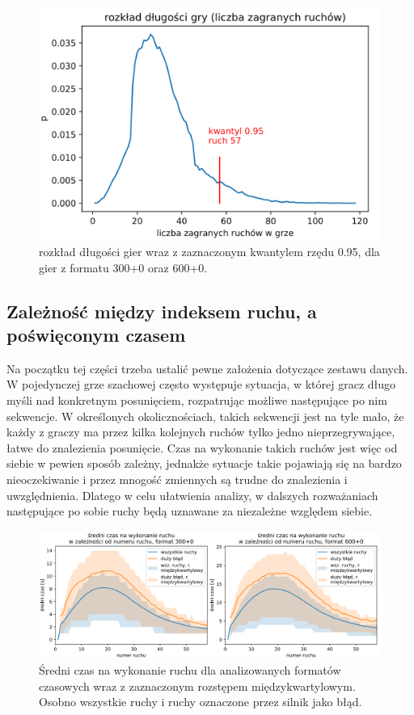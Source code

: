 \documentclass[inzynierska]{pwr_wmat_praca_dyplomowa}
\theoremstyle{plain}
\numberwithin{theorem}{chapter}
\theoremstyle{definition}
\numberwithin{theorem}{chapter}
\begin{document}
\begin{figure}[H]
	\centering
	\includegraphics[width=\textwidth]{dlugosc_gry.png}
	\caption{rozkład długości gier wraz z zaznaczonym kwantylem rzędu 0.95,  dla gier z formatu 300+0 oraz 600+0.}
	\label{rys:dlugosc_gier}
\end{figure}


\subsection{Zależność między indeksem ruchu, a poświęconym czasem}


Na początku tej części trzeba ustalić pewne założenia dotyczące zestawu danych. W pojedynczej grze szachowej często występuje sytuacja, w której gracz długo myśli nad konkretnym posunięciem, rozpatrując możliwe następujące po nim sekwencje. W określonych okolicznościach, takich sekwencji jest na tyle mało, że każdy z graczy ma przez kilka kolejnych ruchów tylko jedno nieprzegrywające, łatwe do znalezienia posunięcie. Czas na wykonanie takich ruchów jest więc od siebie w pewien sposób zależny, jednakże sytuacje takie pojawiają się na bardzo nieoczekiwanie i przez mnogość zmiennych są trudne do znalezienia i uwzględnienia. Dlatego w celu ułatwienia analizy, w dalszych rozważaniach następujące po sobie ruchy będą uznawane za niezależne względem siebie.
\begin{figure}[H]
	\centering
	\includegraphics[width=\textwidth]{sr_czas_na_ruch.png}
	\caption{Średni czas na wykonanie ruchu dla analizowanych formatów czasowych wraz z zaznaczonym rozstępem międzykwartylowym. Osobno wszystkie ruchy i ruchy oznaczone przez silnik jako błąd.}
	\label{rys:sr_czas_na_ruch}
\end{figure}
\end{document}
